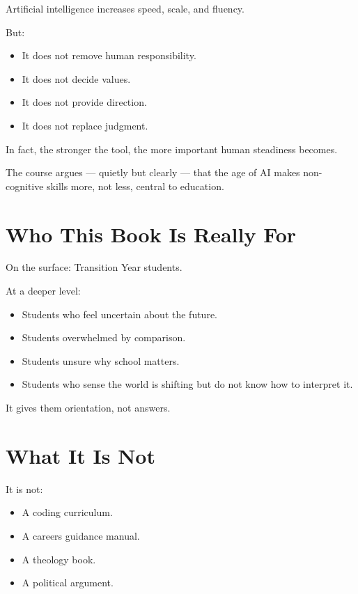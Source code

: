 \documentclass[12pt]{article}
\begin{document}
\begin{tcolorbox}[
  colback=white,
  colframe=red!60!black,
  opacityframe=0.5,
  fonttitle=\bfseries\color{white},
  title={\mdseries\emoji{microscope}\bfseries Science Insights},
  drop shadow
]
Artificial intelligence increases speed, scale, and fluency.

But:
\begin{itemize}
  \item It does not remove human responsibility.
  \item It does not decide values.
  \item It does not provide direction.
  \item It does not replace judgment.
\end{itemize}

In fact, the stronger the tool, the more important human steadiness becomes.
\end{tcolorbox}

The course argues — quietly but clearly — that the age of AI makes non-cognitive skills more, not less, central to education.

\section*{Who This Book Is Really For}

On the surface: Transition Year students.

At a deeper level:
\begin{itemize}
  \item Students who feel uncertain about the future.
  \item Students overwhelmed by comparison.
  \item Students unsure why school matters.
  \item Students who sense the world is shifting but do not know how to interpret it.
\end{itemize}

It gives them orientation, not answers.

\section*{What It Is Not}

It is not:
\begin{itemize}
  \item A coding curriculum.
  \item A careers guidance manual.
  \item A theology book.
  \item A political argument.
\end{itemize}
\end{document}
